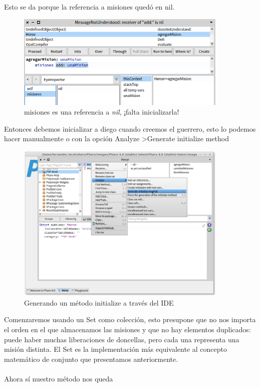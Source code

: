 \documentclass[a4paper,12pt]{book}
\begin{document}
Esto se da porque la referencia a misiones quedó en nil. 

\begin{figure}[h!]
    \centering	
    \includegraphics[width=0.9\textwidth]{images/12_error_debugging_2.png}
    \caption{misiones es una referencia a \textit{nil}, ¡falta inicializarla!}
\end{figure}
\FloatBarrier

Entonces debemos inicializar a diego cuando creemos el guerrero, esto lo podemos hacer manualmente o con la opción
Analyze \textgreater Generate initialize method

\begin{figure}[h!]
    \centering	
    \includegraphics[width=0.9\textwidth]{images/13_generate_initialize.png}
    \caption{Generando un método initialize a través del IDE}
\end{figure}
\FloatBarrier

Comenzaremos usando un Set como colección, esto presupone que no nos importa el orden en el que almacenamos las
misiones y que no hay elementos duplicados: puede haber muchas liberaciones de doncellas, pero cada una 
representa una misión distinta. El Set es la implementación más equivalente al concepto matemático de conjunto
que presentamos anteriormente.
\\
\\
Ahora sí nuestro método nos queda
\end{document}
